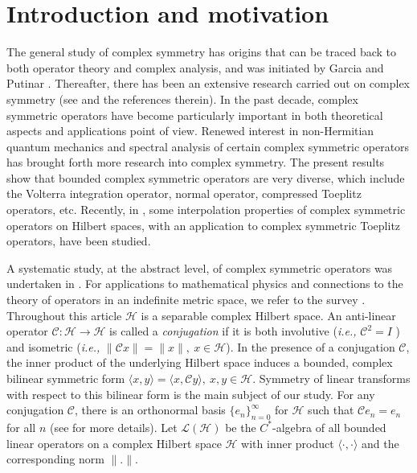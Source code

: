 \documentclass[12pt, reqno]{amsart}
\theoremstyle{definition}
\theoremstyle{remark}
\numberwithin{equation}{section}
\begin{document}
%

\tableofcontents



\section{Introduction and motivation}
The general study of complex symmetry has origins that can be traced back to both operator theory and complex analysis, and was initiated by Garcia and Putinar \cite{Garcia_Putinar_2006, Garcia_Putinar_2007}. Thereafter, there has been an extensive research carried out on complex symmetry (see \cite{Garcia_Prodan_Putinar_2014} and the references therein). In the past decade, complex symmetric operators have become particularly important
in both theoretical aspects and applications point of view. Renewed interest in non-Hermitian quantum mechanics and spectral analysis of certain complex symmetric operators has brought forth more research into complex symmetry. The present results show that bounded complex symmetric operators are very diverse, which include the Volterra integration operator, normal operator, compressed Toeplitz operators, etc. Recently, in \cite{Mleczko_Szwedek_2018}, some interpolation properties of complex symmetric operators on Hilbert spaces, with an application to complex symmetric Toeplitz operators, have been studied. \\
\par
A systematic study, at the abstract level, of complex symmetric operators was undertaken in \cite{Garcia_Putinar_2006, Garcia_Putinar_2007, Garcia_Hammond, Hai_PA_2020, Hai_Putinar_JDE_2018}. For applications to mathematical physics	and connections to the theory of operators in an indefinite metric space, we refer to the survey \cite{Garcia_Prodan_Putinar_2014}.
	 Throughout this article $\mathcal{H}$ is a separable complex Hilbert space. An anti-linear operator $\mathcal{C}: \mathcal{H}\rightarrow \mathcal{H}$ is called a {\it conjugation} if it is both involutive ({\it i.e.,} $\mathcal{C}^2=I$ ) and isometric ({\it i.e.,} $\|\mathcal{C}x\|=\|x\|,~ x\in \mathcal{H}$). In the presence of a conjugation $\mathcal{C}$, the inner product of the underlying Hilbert space induces a bounded, complex bilinear symmetric form $\langle x,y \rangle=\langle x, \mathcal{C}y\rangle,~ x, y\in \mathcal{H}$. Symmetry of linear transforms with respect to this bilinear form is the main subject of our study. For any conjugation $\mathcal{C}$, there is an orthonormal basis $\{e_n\}_{n=0}^\infty$ for $\mathcal{H}$ such that $\mathcal{C}e_n=e_n$ for all $n$ (see \cite{Garcia_Putinar_2006} for more details). Let ${\mathcal{L}}(\mathcal{H})$ be the $C^*$-algebra of all bounded linear operators on a complex Hilbert space $\mathcal{H}$ with inner product $\langle \cdot,\cdot\rangle$ and the corresponding norm $\|.\|$.      
\end{document}
